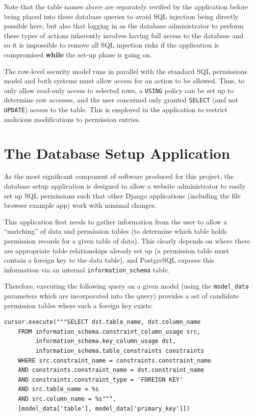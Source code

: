 \documentclass[12pt]{report}
\begin{document}
Note that the table names above are separately verified by the application before being placed into these database queries to avoid SQL injection being directly possible here, but also that logging in as the database administrator to perform these types of actions inherently involves having full access to the database and so it is impossible to remove all SQL injection risks if the application is compromised \textbf{while} the set-up phase is going on.

The row-level security model runs in parallel with the standard SQL permissions model and both systems must allow access for an action to be allowed. Thus, to only allow read-only access to selected rows, a \texttt{USING} policy can be set up to determine row accesses, and the user concerned only granted \texttt{SELECT} (and not \texttt{UPDATE}) access to the table. This is employed in the application to restrict malicious modifications to permission entries.

\section{The Database Setup Application}
As the most significant component of software produced for this project, the database setup application is designed to allow a website administrator to easily set up SQL permissions such that other Django applications (including the file browser example app) work with minimal changes.

This application first needs to gather information from the user to allow a ``matching'' of data and permission tables (to determine which table holds permission records for a given table of data). This clearly depends on where there are appropriate table relationships already set up (a permission table must contain a foreign key to the data table), and PostgreSQL exposes this information via an internal \verb+information_schema+ table.

Therefore, executing the following query on a given model (using the \verb+model_data+ parameters which are incorporated into the query) provides a set of candidate permission tables where such a foreign key exists:

\begin{verbatim}
cursor.execute("""SELECT dst.table_name, dst.column_name
    FROM information_schema.constraint_column_usage src,
         information_schema.key_column_usage dst,
         information_schema.table_constraints constraints
    WHERE src.constraint_name = constraints.constraint_name
    AND constraints.constraint_name = dst.constraint_name
    AND constraints.constraint_type = 'FOREIGN KEY'
    AND src.table_name = %s
    AND src.column_name = %s""",
    [model_data['table'], model_data['primary_key']])
\end{verbatim}
\end{document}
